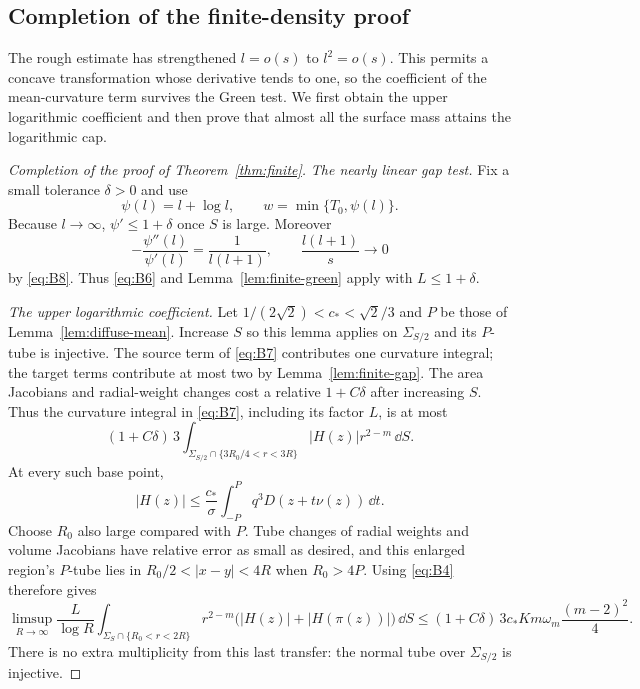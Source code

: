 \subsection{Completion of the finite-density proof}

The rough estimate has strengthened \(l=o(s)\) to \(l^2=o(s)\).
This permits a concave transformation whose derivative tends to one,
so the coefficient of the mean-curvature term survives the Green test.
We first obtain the upper logarithmic coefficient and then prove that
almost all the surface mass attains the logarithmic cap.

\begin{proof}[Completion of the proof of Theorem~\ref{thm:finite}]
\emph{The nearly linear gap test.}
Fix a small tolerance \(\delta>0\) and use
\[
 \psi(l)=l+\log l,\qquad w=\min\{T_0,\psi(l)\}.
\]
Because \(l\to\infty\), \(\psi'\le1+\delta\) once \(S\) is large.
Moreover
\[
 -\frac{\psi''(l)}{\psi'(l)}=\frac1{l(l+1)},\qquad
 \frac{l(l+1)}{s}\longrightarrow0
\]
by \eqref{eq:B8}.  Thus \eqref{eq:B6} and Lemma~\ref{lem:finite-green}
apply with \(L\le1+\delta\).

\emph{The upper logarithmic coefficient.}
Let \(1/(2\sqrt2)<c_*<\sqrt2/3\) and \(P\) be those of
Lemma~\ref{lem:diffuse-mean}.  Increase \(S\) so this lemma applies on
\(\Sigma_{S/2}\) and its \(P\)-tube is injective.  The source term of
\eqref{eq:B7} contributes one curvature integral; the target terms
contribute at most two by Lemma~\ref{lem:finite-gap}.  The area Jacobians
and radial-weight changes cost a relative \(1+C\delta\) after increasing
\(S\).  Thus the curvature integral in \eqref{eq:B7}, including its
factor \(L\), is at most
\[
 (1+C\delta)\,3\int_{\Sigma_{S/2}\cap\{3R_0/4<r<3R\}}
                        |H(z)|r^{2-m}\,\dd S.
\]
At every such base point,
\[
 |H(z)|\le\frac{c_*}{\sigma}
             \int_{-P}^{P}q^3D(z+t\nu(z))\,\dd t.
\]
Choose \(R_0\) also large compared with \(P\).
Tube changes of radial weights and volume Jacobians have relative
error as small as desired, and this enlarged region's \(P\)-tube lies in
\(R_0/2<|x-y|<4R\) when \(R_0>4P\).
Using \eqref{eq:B4} therefore gives
\begin{equation}\label{eq:B9}
 \limsup_{R\to\infty}\frac{L}{\log R}
 \int_{\Sigma_S\cap\{R_0<r<2R\}}
 r^{2-m}\bigl(|H(z)|+|H(\pi(z))|\bigr)\,\dd S
 \le (1+C\delta)\,3c_*K m\omega_m\frac{(m-2)^2}{4}.
\end{equation}
There is no extra multiplicity from this last transfer: the normal
tube over \(\Sigma_{S/2}\) is injective.


\end{proof}

